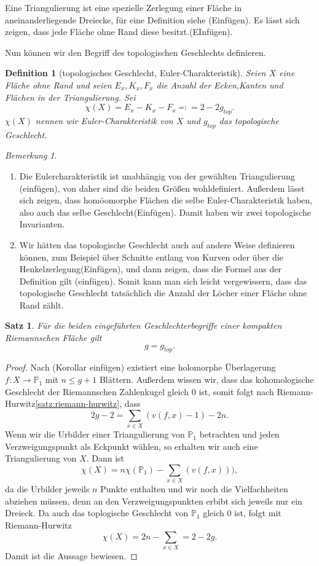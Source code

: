 \documentclass[11pt,a4paper]{scrartcl}
\theoremstyle{thm}
\newtheorem{satz}{Satz}[section]
\theoremstyle{def}
\newtheorem{defi}{Definition}[section]
\theoremstyle{remark}
\newtheorem*{bem}{Bemerkung}
\begin{document}
Eine Triangulierung ist eine spezielle Zerlegung einer Fläche in aneinanderliegende Dreiecke, für eine Definition siehe (Einfügen). Es lässt sich zeigen, dass jede Fläche ohne Rand diese besitzt.(EInfügen). 

Nun können wir den Begriff des topologischen Geschlechts definieren. 
\begin{defi}[topologisches Geschlecht, Euler-Charakteristik]
	Seien $X$ eine Fläche ohne Rand und seien $E_x,K_x,F_x$ die Anzahl der Ecken,Kanten und Flächen in der Triangulierung. Sei 
	\[
	\chi (X) = E_x-K_x-F_x\eqqcolon = 2-2g_{top}.
	\]
	$\chi(X)$ nennen wir \emph{Euler-Charakteristik} von $X$ und $g_{top}$ das \emph{topologische Geschlecht}. 
\end{defi}
\begin{bem}
	\begin{enumerate}
		\item Die Eulercharakteristik ist unabhängig von der gewählten Triangulierung (einfügen), von daher sind die beiden Größen wohldefiniert. Außerdem lässt sich zeigen, dass homöomorphe Flächen die selbe Euler-Charakteristik haben, also auch das selbe Geschlecht(Einfügen). Damit haben wir zwei topologische Invarianten. 
		\item Wir hätten das topologische Geschlecht auch auf andere Weise definieren können, zum Beispiel über Schnitte entlang von Kurven oder über die Henkelzerlegung(Einfügen), und dann zeigen, dass die Formel aus der Definition gilt (einfügen). Somit kann man sich leicht vergewissern, dass das topologische Geschlecht tatsächlich die Anzahl der Löcher einer Fläche ohne Rand zählt.
		\end{enumerate}
\end{bem}
\begin{satz}
	Für die beiden eingeführten Geschlechterbegriffe einer kompakten Riemannschen Fläche gilt \[
	g = g_{top}.
	\]
\end{satz}
\begin{proof}
	Nach (Korollar einfügen)  existiert eine holomorphe Überlagerung $f:X\rightarrow \mathbb{P}_1$ mit $n\leq g+1$ Blättern. Außerdem wissen wir, dass das kohomologische Geschlecht der Riemannschen Zahlenkugel gleich $0$ ist, somit folgt nach Riemann-Hurwitz\ref{satz:riemann-hurwitz}, dass 
	\[
	2g-2 =\sum_{x\in X}(v(f,x)-1) -2n. 
	\]
	Wenn wir die Urbilder einer Triangulierung von $\mathbb{P}_1$ betrachten und jeden Verzweigungspunkt als Eckpunkt wählen, so erhalten wir auch eine Triangulierung von $X$.
	Dann ist 
	\[
	\chi(X) = n\chi(\mathbb{P}_1)-\sum_{x\in X}(v(f,x))),
	\]
	da die Urbilder jeweils $n$ Punkte enthalten und wir noch die Vielfachheiten abziehen müssen, denn an den Verzweigungspunkten erbibt sich jeweils nur ein Dreieck.
	Da auch das toplogische Geschlecht von $\mathbb{P}_1$ gleich $0$ ist, folgt mit Riemann-Hurwitz
	\[
	\chi(X) = 2n-\sum_{x\in X} = 2-2g.
	\]
	Damit ist die Aussage bewiesen.
\end{proof}
\end{document}
